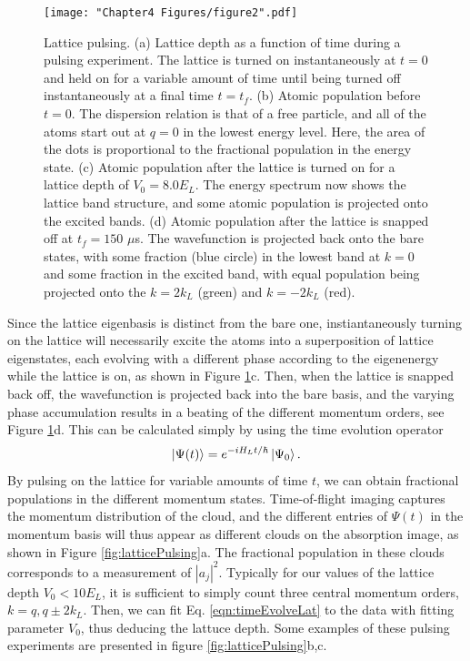 \begin{figure}
\texttt{[image: "Chapter4 Figures/figure2".pdf]}
\caption{Lattice pulsing. (a) Lattice depth as a function of time during a pulsing experiment. The lattice is turned on instantaneously at $t=0$ and held on for a variable amount of time until being turned off instantaneously at a final time $t=t_f$. (b) Atomic population before $t=0$. The dispersion relation is that of a free particle, and all of the atoms start out at $q=0$ in the lowest energy level. Here, the area of the dots is proportional to the fractional population in the energy state. (c) Atomic population after the lattice is turned on for a lattice depth of $V_0 = 8.0 E_L$. The energy spectrum now shows the lattice band structure, and some atomic population is projected onto the excited bands. (d) Atomic population after the lattice is snapped off at $t_f = 150$ $\mu$s. The wavefunction is projected back onto the bare states, with some fraction (blue circle) in the lowest band at $k=0$ and some fraction in the excited band, with equal population being projected onto the $k = 2 k_L$ (green) and $k=-2k_L$ (red). }
\label{fig:pulsingSchematic}
\end{figure}
Since the lattice eigenbasis is distinct from the bare one, instiantaneously turning on the lattice will necessarily excite the atoms into a superposition of lattice eigenstates, each evolving with a different phase according to the eigenenergy while the lattice is on, as shown in  Figure \ref{fig:pulsingSchematic}c. Then, when the lattice is snapped back off, the wavefunction is projected back into the bare basis, and the varying phase accumulation results in a beating of the different momentum orders, see  Figure \ref{fig:pulsingSchematic}d. This can be calculated simply by using the time evolution operator
\begin{equation}
\mathinner{|{\Psi(t)}\rangle} = e^{-i H_L t/\hbar}\mathinner{|{\Psi_0}\rangle}.
\label{eqn:timeEvolveLat}
\end{equation}
By pulsing on the lattice for variable amounts of time $t$, we can obtain fractional populations in the different momentum states. Time-of-flight imaging captures the momentum distribution of the cloud, and the different entries of $\Psi(t)$ in the momentum basis will thus appear as different clouds on the absorption image, as shown in Figure \ref{fig:latticePulsing}a. The fractional population in these clouds corresponds to a measurement of $|a_j|^2$.  Typically for our values of the lattice depth $V_0 < 10 E_L$, it is sufficient to simply count three central momentum orders, $k = q, q \pm 2 k_L$. Then, we can fit Eq. \ref{eqn:timeEvolveLat} to the data with fitting parameter $V_0$, thus deducing the lattuce depth. Some examples of these pulsing experiments are presented in figure \ref{fig:latticePulsing}b,c.
